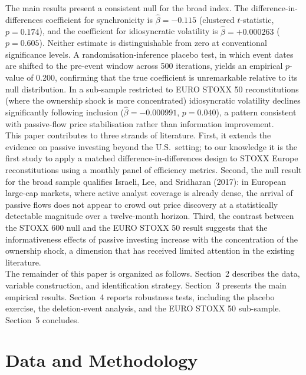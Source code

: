 \documentclass[12pt, a4paper]{article}
\begin{document}
The main results present a consistent null for the broad index. The difference-in-differences coefficient for synchronicity is $\hat{\beta} = -0.115$ (clustered $t$-statistic, $p = 0.174$), and the coefficient for idiosyncratic volatility is $\hat{\beta} = +0.000263$ ($p = 0.605$). Neither estimate is distinguishable from zero at conventional significance levels. A randomisation-inference placebo test, in which event dates are shifted to the pre-event window across 500 iterations, yields an empirical $p$-value of 0.200, confirming that the true coefficient is unremarkable relative to its null distribution. In a sub-sample restricted to EURO STOXX 50 reconstitutions (where the ownership shock is more concentrated) idiosyncratic volatility declines significantly following inclusion ($\hat{\beta} = -0.000991$, $p = 0.040$), a pattern consistent with passive-flow price stabilisation rather than information improvement.\\

This paper contributes to three strands of literature. First, it extends the evidence on passive investing beyond the U.S.\ setting; to our knowledge it is the first study to apply a matched difference-in-differences design to STOXX Europe reconstitutions using a monthly panel of efficiency metrics. Second, the null result for the broad sample qualifies Israeli, Lee, and Sridharan (2017): in European large-cap markets, where active analyst coverage is already dense, the arrival of passive flows does not appear to crowd out price discovery at a statistically detectable magnitude over a twelve-month horizon. Third, the contrast between the STOXX 600 null and the EURO STOXX 50 result suggests that the informativeness effects of passive investing increase with the concentration of the ownership shock, a dimension that has received limited attention in the existing literature.\\

The remainder of this paper is organized as follows. Section~2 describes the data, variable construction, and identification strategy. Section~3 presents the main empirical results. Section~4 reports robustness tests, including the placebo exercise, the deletion-event analysis, and the EURO STOXX 50 sub-sample. Section~5 concludes.\\

\section{Data and Methodology}
\label{sec:methodology}
\end{document}

